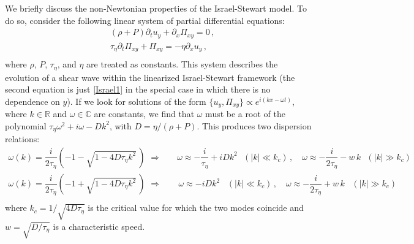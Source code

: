 \documentclass[a4paper, amsfonts, amssymb, amsmath, reprint, showkeys, nofootinbib, twoside, onecolumn, notitlepage]{revtex4-1}
\theoremstyle{definition}
\theoremstyle{theorem}
\begin{document}
We briefly discuss the non-Newtonian properties of the Israel-Stewart model.
To do so, consider the following linear system of partial differential equations:
\begin{equation}\label{camusa}
    \begin{split}
 & (\rho+P)\partial_t  u_y +\partial_x  \Pi_{xy}=0 \, , \\
 & \tau_\eta \partial_t \Pi_{xy}+\Pi_{xy}=-\eta \partial_x u_y \, , \\
    \end{split}
\end{equation}
where $\rho$, $P$, $\tau_\eta$, and $\eta$ are treated as constants. 
This system  describes the evolution of a shear wave within the linearized Israel-Stewart framework (the second equation is just \eqref{Israel1} in the special case in which there is no dependence on $y$). 
If we look for solutions of the form $\{ u_y ,\Pi_{xy}\}\propto e^{i(kx-\omega t)}$, where $k\in \mathbb{R}$ and $\omega\in \mathbb{C}$ are constants, we find that $\omega$ must be a root of the polynomial $\tau_\eta\omega^2+i\omega-Dk^2$, with $D=\eta/(\rho+P)$. This produces two dispersion relations:
\begin{equation}
\label{MaestroSplinter}
\begin{split}
     \omega(k) = 
     \dfrac{i}{2\tau_\eta} \left(-1-\sqrt{1-4D\tau_\eta k^2} \, \right)  
     \,\, \Rightarrow \quad &
    \omega \approx -\dfrac{i}{\tau_\eta} + i D k^2 
     \,\,\,\, (|k|\ll k_c) \, ,
     \quad 
     \omega \approx -\dfrac{i}{2\tau_\eta} - w \, k 
     \,\,\,\,(|k|\gg k_c)
     \\
     \omega(k) = \dfrac{i}{2\tau_\eta} \left(-1+\sqrt{1-4D\tau_\eta k^2} \, \right) 
     \,\, \Rightarrow \quad &
     \, \omega \approx - i D k^2 
     \,\,\,\,\, (|k|\ll k_c) \, ,
     \quad 
     \omega \approx -\dfrac{i}{2\tau_\eta} + w \, k 
     \,\,\,\,\, \left(|k|\gg k_c\right)
     \\
\end{split} 
\end{equation} 
where $k_c=1/\sqrt{4D\tau_\eta}$ is the critical value for which the two modes coincide and $w=\sqrt{D/\tau_\eta}$ is a characteristic speed.
\end{document}
